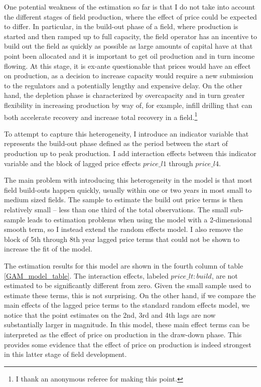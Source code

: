 \documentclass[12pt]{article}
\begin{document}
One potential weakness of the estimation so far is that I do not take into account the different stages of field production, where the effect of price could be expected to differ. 
In particular, in the build-out phase of a field, where production is started and then ramped up to full capacity, the field operator has an incentive to build out the field as quickly as possible as large amounts of capital have at that point been allocated and it is important to get oil production and in turn income flowing. At this stage, it is ex-ante questionable that prices would have an effect on production, as a decision to increase capacity would require a new submission to the regulators and a potentially lengthy and expensive delay. On the other hand, the depletion phase is characterized by overcapacity and in turn greater flexibility in increasing production by way of, for example, infill drilling that can both accelerate recovery and increase total recovery in a field.\footnote{I thank an anonymous referee for making this point.}

To attempt to capture this heterogeneity, I introduce an indicator variable that represents the build-out phase defined as the period between the start of production up to peak production. I add interaction effects between this indicator variable and the block of lagged price effects $price\_l1$ through $price\_l4$.

The main problem with introducing this heterogeneity in the model is that most field build-outs happen quickly, usually within one or two years in most small to medium sized fields. The sample to estimate the build out price terms is then relatively small -- less than one third of the total observations. The small sub-sample leads to estimation problems when using the model with a 2-dimensional smooth term, so I instead extend the random effects model. I also remove the block of 5th through 8th year lagged price terms that could not be shown to increase the fit of the model.

The estimation results for this model are shown in the fourth column of table \ref{GAM_model_table}. The interaction effects, labeled $price\_lt:build$, are not estimated to be significantly different from zero. Given the small sample used to estimate these terms, this is not surprising. On the other hand, if we compare the main effects of the lagged price terms to the standard random effects model, we notice that the point estimates on the 2nd, 3rd and 4th lags are now substantially larger in magnitude. In this model, these main effect terms can be interpreted as the effect of price on production in the draw-down phase. This provides some evidence that the effect of price on production is indeed strongest in this latter stage of field development.
\end{document}
